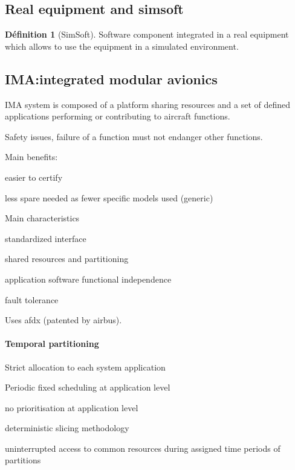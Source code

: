 \documentclass[10pt]{article}
\theoremstyle{plain}
\theoremstyle{definition}
\newtheorem{defn}{Définition}
\theoremstyle{remark}
\begin{document}
\subsection{Real equipment and simsoft}
\begin{defn}
	[SimSoft]
	Software component integrated in a real equipment which allows to use the
	equipment in a simulated environment.
\end{defn}

\subsection{IMA:\@ integrated modular avionics}
IMA system is composed of a platform sharing resources and a set of defined
applications performing or contributing to aircraft functions.

Safety issues, failure of a function must not endanger other functions.

Main benefits:
\begin{compactitem}
	\item easier to certify
	\item less spare needed as fewer specific models used (generic)
\end{compactitem}

Main characteristics
\begin{compactitem}
	\item standardized interface
	\item shared resources and partitioning
	\item application software functional independence
	\item fault tolerance
\end{compactitem}

Uses afdx (patented by airbus).

\paragraph{Temporal partitioning}\label{par:temporal_partitioning}

\begin{compactitem}
	\item Strict allocation to each system application
	\item Periodic fixed scheduling at application level
	\item no prioritisation at application level
	\item deterministic slicing methodology
	\item uninterrupted access to common resources during assigned time periods
		of partitions
\end{compactitem}
\end{document}
